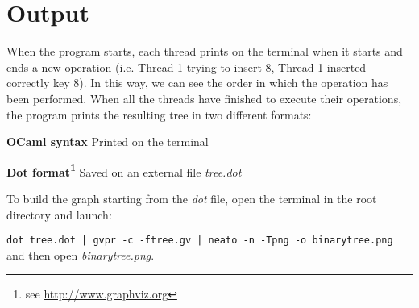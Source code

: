 \documentclass[a4paper]{article}
\begin{document}
\section{Output}
\label{sec:output}
When the program starts, each thread prints on the terminal when it starts and ends a new operation (i.e. Thread-1 trying to insert 8, Thread-1 inserted correctly key 8). In this way, we can see the order in which the operation has been performed.
When all the threads have finished to execute their operations, the program prints the resulting tree in two different formats:
\begin{compactitem}
  \item \textbf{OCaml syntax} Printed on the terminal
  \item \textbf{Dot format\footnote{see \url{http://www.graphviz.org}}} Saved on an external file \emph{tree.dot}
\end{compactitem}

\noindent
To build the graph starting from the \emph{dot} file, open the terminal in the root directory and launch:

\verb!dot tree.dot | gvpr -c -ftree.gv | neato -n -Tpng -o binarytree.png!
\\
\noindent
and then open \emph{binarytree.png}. 
\end{document}
